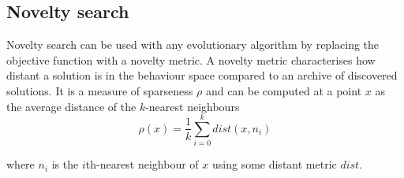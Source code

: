 \newpage
\subsection{Novelty search}
Novelty search can be used with any evolutionary algorithm by replacing the objective
function with a novelty metric. A novelty metric characterises how distant a solution
is in the behaviour space compared to an archive of discovered solutions. It is a measure
of sparseness $\rho$ and can be computed at a point $x$ as the average distance of the
$k$-nearest neighbours
\[
    \rho(x) = \frac{1}{k} \sum_{i=0}^{k} dist(x, n_{i})
\]

where $n_{i}$ is the $i$th-nearest neighbour of $x$ using some distant metric $dist$.

\cite{ns_study}
